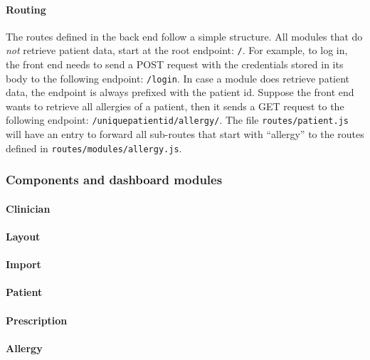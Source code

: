         \paragraph{Routing} The routes defined in the back end follow a simple structure. All modules that do \emph{not} retrieve patient data, start at the root endpoint: \texttt{/}. For example, to log in, the front end needs to send a POST request with the credentials stored in its body to the following endpoint: \texttt{/login}. In case a module does retrieve patient data, the endpoint is always prefixed with the patient id. Suppose the front end wants to retrieve all allergies of a patient, then it sends a GET request to  the following endpoint: \texttt{/uniquepatientid/allergy/}. The file \texttt{routes/patient.js} will have an entry to forward all sub-routes that start with ``allergy'' to the routes defined in \texttt{routes/modules/allergy.js}.

        \subsubsection{Components and dashboard modules}


            \paragraph{Clinician}

            \paragraph{Layout}

            \paragraph{Import}

            \paragraph{Patient}


                \paragraph{Prescription}

                \paragraph{Allergy}

